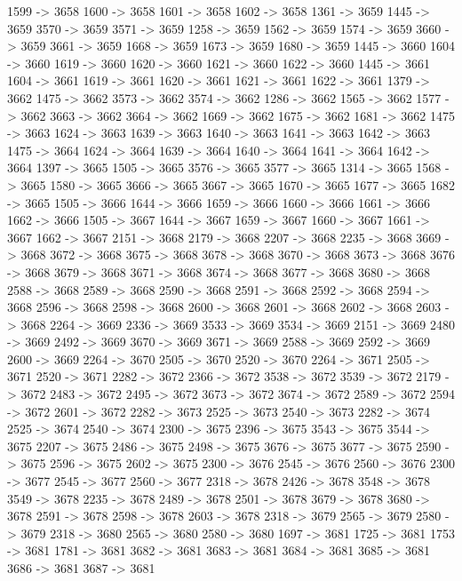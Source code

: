 {	1599 -> 3658
	1600 -> 3658
	1601 -> 3658
	1602 -> 3658
	1361 -> 3659
	1445 -> 3659
	3570 -> 3659
	3571 -> 3659
	1258 -> 3659
	1562 -> 3659
	1574 -> 3659
	3660 -> 3659
	3661 -> 3659
	1668 -> 3659
	1673 -> 3659
	1680 -> 3659
	1445 -> 3660
	1604 -> 3660
	1619 -> 3660
	1620 -> 3660
	1621 -> 3660
	1622 -> 3660
	1445 -> 3661
	1604 -> 3661
	1619 -> 3661
	1620 -> 3661
	1621 -> 3661
	1622 -> 3661
	1379 -> 3662
	1475 -> 3662
	3573 -> 3662
	3574 -> 3662
	1286 -> 3662
	1565 -> 3662
	1577 -> 3662
	3663 -> 3662
	3664 -> 3662
	1669 -> 3662
	1675 -> 3662
	1681 -> 3662
	1475 -> 3663
	1624 -> 3663
	1639 -> 3663
	1640 -> 3663
	1641 -> 3663
	1642 -> 3663
	1475 -> 3664
	1624 -> 3664
	1639 -> 3664
	1640 -> 3664
	1641 -> 3664
	1642 -> 3664
	1397 -> 3665
	1505 -> 3665
	3576 -> 3665
	3577 -> 3665
	1314 -> 3665
	1568 -> 3665
	1580 -> 3665
	3666 -> 3665
	3667 -> 3665
	1670 -> 3665
	1677 -> 3665
	1682 -> 3665
	1505 -> 3666
	1644 -> 3666
	1659 -> 3666
	1660 -> 3666
	1661 -> 3666
	1662 -> 3666
	1505 -> 3667
	1644 -> 3667
	1659 -> 3667
	1660 -> 3667
	1661 -> 3667
	1662 -> 3667
	2151 -> 3668
	2179 -> 3668
	2207 -> 3668
	2235 -> 3668
	3669 -> 3668
	3672 -> 3668
	3675 -> 3668
	3678 -> 3668
	3670 -> 3668
	3673 -> 3668
	3676 -> 3668
	3679 -> 3668
	3671 -> 3668
	3674 -> 3668
	3677 -> 3668
	3680 -> 3668
	2588 -> 3668
	2589 -> 3668
	2590 -> 3668
	2591 -> 3668
	2592 -> 3668
	2594 -> 3668
	2596 -> 3668
	2598 -> 3668
	2600 -> 3668
	2601 -> 3668
	2602 -> 3668
	2603 -> 3668
	2264 -> 3669
	2336 -> 3669
	3533 -> 3669
	3534 -> 3669
	2151 -> 3669
	2480 -> 3669
	2492 -> 3669
	3670 -> 3669
	3671 -> 3669
	2588 -> 3669
	2592 -> 3669
	2600 -> 3669
	2264 -> 3670
	2505 -> 3670
	2520 -> 3670
	2264 -> 3671
	2505 -> 3671
	2520 -> 3671
	2282 -> 3672
	2366 -> 3672
	3538 -> 3672
	3539 -> 3672
	2179 -> 3672
	2483 -> 3672
	2495 -> 3672
	3673 -> 3672
	3674 -> 3672
	2589 -> 3672
	2594 -> 3672
	2601 -> 3672
	2282 -> 3673
	2525 -> 3673
	2540 -> 3673
	2282 -> 3674
	2525 -> 3674
	2540 -> 3674
	2300 -> 3675
	2396 -> 3675
	3543 -> 3675
	3544 -> 3675
	2207 -> 3675
	2486 -> 3675
	2498 -> 3675
	3676 -> 3675
	3677 -> 3675
	2590 -> 3675
	2596 -> 3675
	2602 -> 3675
	2300 -> 3676
	2545 -> 3676
	2560 -> 3676
	2300 -> 3677
	2545 -> 3677
	2560 -> 3677
	2318 -> 3678
	2426 -> 3678
	3548 -> 3678
	3549 -> 3678
	2235 -> 3678
	2489 -> 3678
	2501 -> 3678
	3679 -> 3678
	3680 -> 3678
	2591 -> 3678
	2598 -> 3678
	2603 -> 3678
	2318 -> 3679
	2565 -> 3679
	2580 -> 3679
	2318 -> 3680
	2565 -> 3680
	2580 -> 3680
	1697 -> 3681
	1725 -> 3681
	1753 -> 3681
	1781 -> 3681
	3682 -> 3681
	3683 -> 3681
	3684 -> 3681
	3685 -> 3681
	3686 -> 3681
	3687 -> 3681
}
